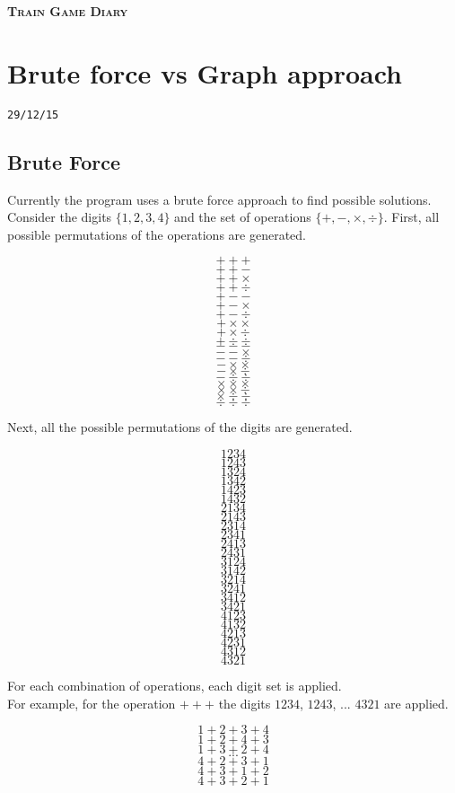 \documentclass[12pt,a4paper]{article}
\begin{document}
\begin{center}
\textsc{\Huge \textbf{Train Game Diary}}
\end{center}

\section*{Brute force vs Graph approach}
\noindent \texttt{29/12/15}\\
\subsection*{Brute Force}
\noindent Currently the program uses a brute force approach to find possible solutions. Consider the digits $\lbrace1,2,3,4\rbrace$ and the set of operations $\lbrace+,-,\times,\div\rbrace$. First, all possible permutations of the operations are generated.
\begin{framed}
\begin{multicols*}{5}
\noindent 
$$+ + +$$
$$+ + -$$
$$+ + \times$$
$$+ + \div$$
$$+ - -$$
$$+ - \times$$
$$+ - \div$$
$$+ \times \times$$
$$+ \times \div$$
$$+ \div \div$$
$$- - -$$
$$- - \times$$
$$- - \div$$
$$- \times \times$$
$$- \times \div$$
$$- \div \div$$
$$\times \times \times$$
$$\times \times \div$$
$$\times \div \div$$
$$\div \div \div$$
\end{multicols*}
\end{framed}

Next, all the possible permutations of the digits are generated.
\begin{framed}
\begin{multicols}{4}
\noindent 
$$1 2 3 4$$
$$1 2 4 3$$
$$1 3 2 4$$
$$1 3 4 2$$
$$1 4 2 3$$
$$1 4 3 2$$
$$2 1 3 4$$
$$2 1 4 3$$
$$2 3 1 4$$
$$2 3 4 1$$
$$2 4 1 3$$
$$2 4 3 1$$
$$3 1 2 4$$
$$3 1 4 2$$
$$3 2 1 4$$
$$3 2 4 1$$
$$3 4 1 2$$
$$3 4 2 1$$
$$4 1 2 3$$
$$4 1 3 2$$
$$4 2 1 3$$
$$4 2 3 1$$
$$4 3 1 2$$
$$4 3 2 1$$
\end{multicols}
\end{framed}

For each combination of operations, each digit set is applied.\\

For example, for the operation $+ + +$ the digits $1234$, $1243$, ... $4321$ are applied.
\begin{framed}
\noindent 
$$1+2+3+4$$
$$1+2+4+3$$
$$1+3+2+4$$
$$...$$
$$4+2+3+1$$
$$4+3+1+2$$
$$4+3+2+1$$
\end{framed}
\end{document}
